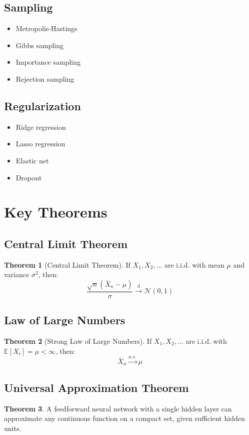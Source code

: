 \documentclass[11pt]{article}
\theoremstyle{definition}
\newtheorem{theorem}{Theorem}[section]
\begin{document}
\subsection{Sampling}
\begin{itemize}
    \item Metropolis-Hastings
    \item Gibbs sampling
    \item Importance sampling
    \item Rejection sampling
\end{itemize}

\subsection{Regularization}
\begin{itemize}
    \item Ridge regression
    \item Lasso regression
    \item Elastic net
    \item Dropout
\end{itemize}

\section{Key Theorems}

\subsection{Central Limit Theorem}
\begin{theorem}[Central Limit Theorem]
If $X_1, X_2, \ldots$ are i.i.d. with mean $\mu$ and variance $\sigma^2$, then:
$$\frac{\sqrt{n}(\bar{X}_n - \mu)}{\sigma} \xrightarrow{d} \mathcal{N}(0,1)$$
\end{theorem}

\subsection{Law of Large Numbers}
\begin{theorem}[Strong Law of Large Numbers]
If $X_1, X_2, \ldots$ are i.i.d. with $\mathbb{E}[X_i] = \mu < \infty$, then:
$$\bar{X}_n \xrightarrow{a.s.} \mu$$
\end{theorem}

\subsection{Universal Approximation Theorem}
\begin{theorem}
A feedforward neural network with a single hidden layer can approximate any continuous function on a compact set, given sufficient hidden units.
\end{theorem}
\end{document}
